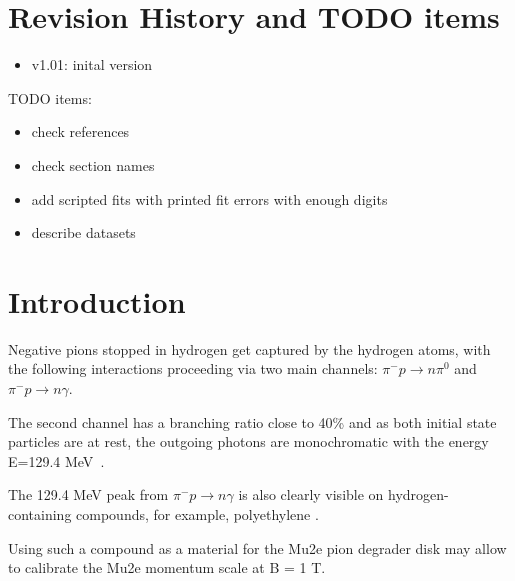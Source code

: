 \documentclass[12pt]{article}
\newcommand {\red}       {\color{red}}
\begin{document}
% 


\newpage
\section {Revision History and TODO items}

\begin{itemize}
\item
  v1.01: inital version
\end{itemize}

{\red
TODO items:

\begin{itemize}
\item
  check references
\item
  check section names
\item
  add scripted fits with printed fit errors with enough digits 
\item
  describe datasets
\end{itemize}
}
\newpage
\section {Introduction}
Negative pions stopped in hydrogen get captured by the hydrogen atoms, 
with the following interactions proceeding via two main channels:
$\pi^- p \to n\pi^0$ and $\pi^- p \to n \gamma$.

The second channel has a branching ratio close to 40\% and as both initial state particles
are at rest, the outgoing photons are monochromatic
with the energy E=129.4 MeV~\cite{RPC_1972_Bistirlich_PhysRevC.5.1867}.

The 129.4 MeV peak from $\pi^- p \to n \gamma$ is also clearly visible on hydrogen-containing
compounds, for example, polyethylene \cite{RPC_1972_Bistirlich_PhysRevC.5.1867}.

Using such a compound as a material for the Mu2e pion degrader disk may allow to calibrate
the Mu2e momentum scale at B = 1 T.
\end{document}
